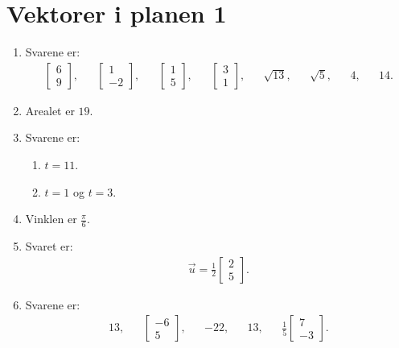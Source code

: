 \section{Vektorer i planen 1}
\begin{enumerate}
	\item Svarene er:
	\begin{align*}
	\begin{bmatrix}
	6\\9
	\end{bmatrix},&&\begin{bmatrix}
	1\\-2
	\end{bmatrix},&&\begin{bmatrix}
	1\\5
	\end{bmatrix},&&\begin{bmatrix}
	3\\1
	\end{bmatrix},&&\sqrt{13},&&\sqrt{5},&&4,&& 14.
	\end{align*}
	
	\item Arealet er $19$.
	
	\item Svarene er:
	\begin{enumerate}
		\item $t=11$.
		\item $t=1$ og $t=3$.
	\end{enumerate}
	
	\item Vinklen er $\frac{\pi}{6}$.
	
	\item Svaret er:
	\begin{align*}
	\vec{u}=\frac{1}{2}\begin{bmatrix}
	2\\5
	\end{bmatrix}.
	\end{align*}
	
	\item Svarene er:
	\begin{align*}
	13,&&\begin{bmatrix}
	-6\\5
	\end{bmatrix},&&-22,&&13,&&\frac{1}{5}\begin{bmatrix}
	7\\-3
	\end{bmatrix}
	.
	\end{align*}
	

\end{enumerate}
